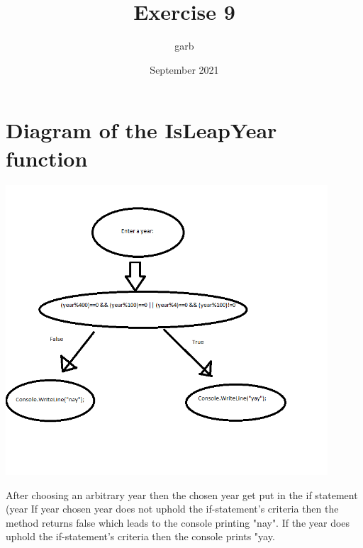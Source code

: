 \documentclass{article}
\title{Exercise 9}
\author{garb }
\date{September 2021}
\begin{document}
\maketitle

\section{Diagram of the IsLeapYear function}
\includegraphics[width=120mm]{Exercise9.png}

After choosing an arbitrary year then the chosen year get put in the if statement (year%
If year chosen year does not uphold the if-statement's criteria  then the method returns false which leads to the console printing "nay". If the year does uphold the if-statement's criteria then the console prints "yay.
\end{document}
